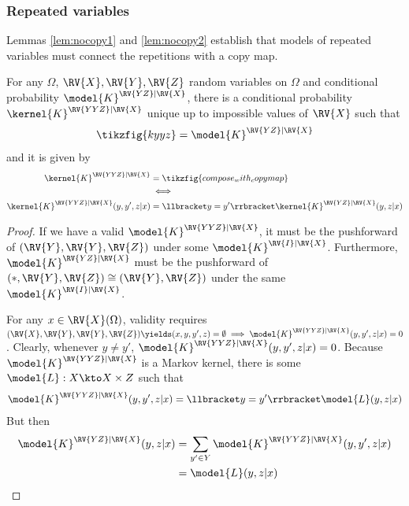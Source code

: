 \subsubsection{Repeated variables}

Lemmas \ref{lem:nocopy1} and \ref{lem:nocopy2} establish that models of repeated variables must connect the repetitions with a copy map.

\begin{lemma}\label{lem:nocopy1}
For any $\Omega$, $\RV{X},\RV{Y},\RV{Z}$ random variables on $\Omega$ and conditional probability $\model{K}^{\RV{YZ}|\RV{X}}$, there is a conditional probability $\kernel{K}^{\RV{YYZ}|\RV{X}}$ unique up to impossible values of $\RV{X}$ such that
\begin{align}
    \tikzfig{kyyz} = \model{K}^{\RV{YZ}|\RV{X}}
\end{align}
and it is given by
\begin{align}
        \kernel{K}^{\RV{YYZ}|\RV{X}} &= \tikzfig{compose_with_copymap}\\
        &\iff \\
        \kernel{K}^{\RV{YYZ}|\RV{X}}(y,y',z|x) &= \llbracket y=y' \rrbracket\kernel{K}^{\RV{YZ}|\RV{X}}(y,z|x)\\
\end{align}
\end{lemma}

\begin{proof}
If we have a valid $\model{K}^{\RV{YYZ}|\RV{X}}$, it must be the pushforward of $(\RV{Y},\RV{Y},\RV{Z})$ under some $\model{K}^{\RV{I}|\RV{X}}$. Furthermore, $\model{K}^{\RV{YZ}|\RV{X}}$ must be the pushforward of $(*,\RV{Y},\RV{Z})\cong (\RV{Y},\RV{Z})$ under the same $\model{K}^{\RV{I}|\RV{X}}$.

For any $x\in \RV{X}(\Omega)$, validity requires $(\RV{X},\RV{Y},\RV{Y},\RV{Z})\yields (x,y,y',z)=\emptyset \implies \model{K}^{\RV{YYZ}|\RV{X}}(y,y',z|x)=0$. Clearly, whenever $y\neq y'$, $\model{K}^{\RV{YYZ}|\RV{X}}(y,y',z|x)=0$. Because $\model{K}^{\RV{YYZ}|\RV{X}}$ is a Markov kernel, there is some $\model{L}:X\kto X\times Z$ such that
\begin{align}
    \model{K}^{\RV{YYZ}|\RV{X}}(y,y',z|x) = \llbracket y=y' \rrbracket \model{L}(y,z|x)\\
\end{align}
But then
\begin{align}
    \model{K}^{\RV{YZ}|\RV{X}}(y,z|x) &= \sum_{y'\in Y} \model{K}^{\RV{YYZ}|\RV{X}}(y,y',z|x)\\
    &= \model{L}(y,z|x)\\
\end{align}
\end{proof}

